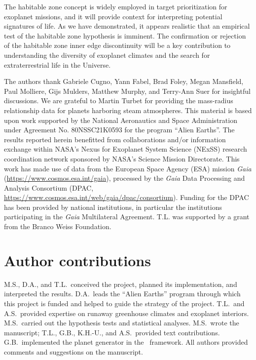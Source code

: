 \documentclass[twocolumn,twocolappendix]{aastex631}
\begin{document}
The habitable zone concept is widely employed in target prioritization for exoplanet missions, and it will provide context for interpreting potential signatures of life.
As we have demonstrated, it appears realistic that an empirical test of the habitable zone hypothesis is imminent.
The confirmation or rejection of the habitable zone inner edge discontinuity will be a key contribution to understanding the diversity of exoplanet climates and the search for extraterrestrial life in the Universe.

\begin{acknowledgments}
The authors thank Gabriele Cugno, Yann Fabel, Brad Foley, Megan Mansfield, Paul Molliere, Gijs Mulders, Matthew Murphy, and Terry-Ann Suer for insightful discussions.
We are grateful to Martin Turbet for providing the mass-radius relationship data for planets harboring steam atmospheres.
This material is based upon work supported by the National Aeronautics and Space Administration under Agreement No. 80NSSC21K0593 for the program ``Alien Earths''.
The results reported herein benefitted from collaborations and/or information exchange within NASA’s Nexus for Exoplanet System Science (NExSS) research coordination network sponsored by NASA’s Science Mission Directorate.
This work has made use of data from the European Space Agency (ESA) mission {\it Gaia} (\url{https://www.cosmos.esa.int/gaia}), processed by the {\it Gaia} Data Processing and Analysis Consortium (DPAC, \url{https://www.cosmos.esa.int/web/gaia/dpac/consortium}). Funding for the DPAC has been provided by national institutions, in particular the institutions participating in the {\it Gaia} Multilateral Agreement.
T.L. was supported by a grant from the Branco Weiss Foundation.
\end{acknowledgments}

\section*{Author contributions}
M.S., D.A., and T.L.\ conceived the project, planned its implementation, and interpreted the results.
D.A.\ leads the ``Alien Earths'' program through which this project is funded and helped to guide the strategy of the project.
T.L.\ and A.S.\ provided expertise on runaway greenhouse climates and exoplanet interiors.
M.S.\ carried out the hypothesis tests and statistical analyses.
M.S.\ wrote the manuscript; T.L., G.B., K.H.-U., and A.S.\ provided text contributions.
G.B.\ implemented the planet generator in the \bioverse\ framework.
All authors provided comments and suggestions on the manuscript.
\end{document}
